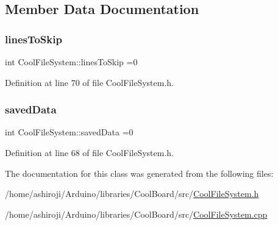 \subsection{Member Data Documentation}
\mbox{\label{class_cool_file_system_a84fdb6057e534b395512463daa28ea3c}} 
\subsubsection{\texorpdfstring{lines\+To\+Skip}{linesToSkip}}
{\footnotesize\ttfamily int Cool\+File\+System\+::lines\+To\+Skip =0\hspace{0.3cm}{\ttfamily [private]}}



Definition at line 70 of file Cool\+File\+System.\+h.

\mbox{\label{class_cool_file_system_ad9f5b739a32100f5f21270c3d9ee2b1d}} 
\subsubsection{\texorpdfstring{saved\+Data}{savedData}}
{\footnotesize\ttfamily int Cool\+File\+System\+::saved\+Data =0\hspace{0.3cm}{\ttfamily [private]}}



Definition at line 68 of file Cool\+File\+System.\+h.



The documentation for this class was generated from the following files\+:\begin{DoxyCompactItemize}
\item 
/home/ashiroji/\+Arduino/libraries/\+Cool\+Board/src/\hyperlink{_cool_file_system_8h}{Cool\+File\+System.\+h}\item 
/home/ashiroji/\+Arduino/libraries/\+Cool\+Board/src/\hyperlink{_cool_file_system_8cpp}{Cool\+File\+System.\+cpp}\end{DoxyCompactItemize}
